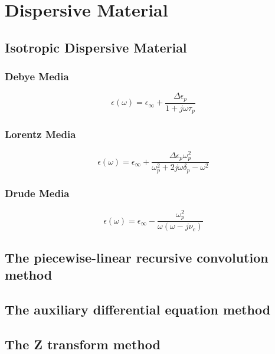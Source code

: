 \section{Dispersive Material}

\subsection{Isotropic Dispersive Material}
\subsubsection{Debye Media}

\begin{displaymath}
  \epsilon(\omega) = \epsilon_{\infty} + \frac{\Delta\epsilon_p}{1+j\omega\tau_p}
\end{displaymath}

\subsubsection{Lorentz Media}


\begin{displaymath}
  \epsilon(\omega) = \epsilon_{\infty} + \frac{\Delta\epsilon_p\omega_p^2}{\omega_p^2 + 2j\omega\delta_p - \omega^2}
\end{displaymath}


\subsubsection{Drude Media}

\begin{displaymath}
  \epsilon(\omega) = \epsilon_{\infty} - \frac{\omega_p^2}{\omega(\omega-j\nu_c)}
\end{displaymath}


\subsection{The piecewise-linear recursive convolution method}
\subsection{The auxiliary differential equation method}
\subsection{The Z transform method}
